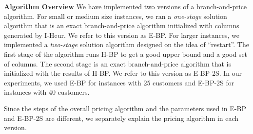 \documentclass[11pt]{article}
\begin{document}

{\bf Algorithm Overview}
We have implemented two versions of a branch-and-price algorithm. 
For small or medium size instances, we ran a {\em one-stage}
solution algorithm that is an exact branch-and-price algorithm 
initialized with columns generated by I-Heur. We refer to
this version as E-BP. For larger instances,
we implemented a {\em two-stage} solution algorithm designed
on the idea of ``restart''. 
The first stage of the algorithm runs H-BP to get a good upper bound and
a good set of columns. The second stage is an exact branch-and-price algorithm 
that is initialized with the results of H-BP. We refer to this version 
as E-BP-2S. In our experiments, we used E-BP for instances with 25 customers and 
E-BP-2S for instances with 40 customers.

Since the steps of the overall pricing algorithm and the parameters used in E-BP and 
E-BP-2S are different, we separately explain the pricing algorithm in each version.
\end{document}
